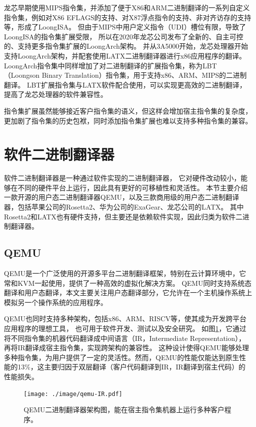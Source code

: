龙芯早期使用MIPS指令集，并添加了便于X86和ARM二进制翻译的一系列自定义指令集，例如对X86 EFLAGS的支持、对X87浮点指令的支持、非对齐访存的支持等，形成了LoongISA\cite{LoongISA}。
但由于MIPS中用户定义指令（UDI）槽位有限，导致了LoongISA的指令集扩展受限，
所以在2020年龙芯公司发布了全新的、自主可控的、支持更多指令集扩展的LoongArch架构\cite{LoongArch2023}。
并从3A5000开始，龙芯处理器开始支持LoongArch架构，并配套使用LATX二进制翻译器进行x86应用程序的翻译。
LoongArch指令集中同样增加了对二进制翻译的扩展指令集，称为LBT（Loongson Binary Translation）指令集，用于支持x86、ARM、MIPS的二进制翻译。
LBT扩展指令集与LATX软件配合使用，可以实现更高效的二进制翻译，提高了龙芯处理器的软件兼容性。

指令集扩展虽然能够接近客户指令集的语义，但这样会增加宿主指令集的复杂度，更加剧了指令集的历史包袱，同时添加指令集扩展也难以支持多种指令集的兼容。

\section{软件二进制翻译器}

软件二进制翻译器是一种通过软件实现的二进制翻译器，
它对硬件改动较小，能够在不同的硬件平台上运行，因此具有更好的可移植性和灵活性。
本节主要介绍一款开源的用户态二进制翻译器QEMU，以及三款商用级的用户态二进制翻译器，包括苹果公司的Rosetta2、华为公司的ExaGear、龙芯公司的LATX。
其中Rosetta2和LATX也有硬件支持，但主要还是依赖软件实现，因此归类为软件二进制翻译器。

\subsection{QEMU}

QEMU是一个广泛使用的开源多平台二进制翻译框架，特别在云计算环境中，它常和KVM一起使用，提供了一种高效的虚拟化解决方案。
QEMU同时支持系统态翻译和用户态翻译，本文主要关注用户态翻译部分，它允许在一个主机操作系统上模拟另一个操作系统的应用程序。

QEMU也同时支持多种架构，包括x86、ARM、RISCV等，使其成为开发跨平台应用程序的理想工具， 也可用于软件开发、测试以及安全研究。
如图\ref{img:qemu_arch}，它通过将不同指令集的机器代码翻译成中间语言（IR，Intermediate Representation），再将IR翻译成宿主指令集，实现跨架构的兼容性。
这种设计使得QEMU能够处理多种指令集，为用户提供了一定的灵活性。然而，QEMU的性能仅能达到原生性能的13\%，这主要归因于双层翻译（客户代码翻译到IR，IR翻译到宿主代码）的性能损失。

\begin{figure}[!htbp]
  \centering
  \texttt{[image: ./image/qemu-IR.pdf]}
  \caption{QEMU二进制翻译器架构图，能在宿主指令集机器上运行多种客户程序。}
  \label{img:qemu_arch}
\end{figure}


